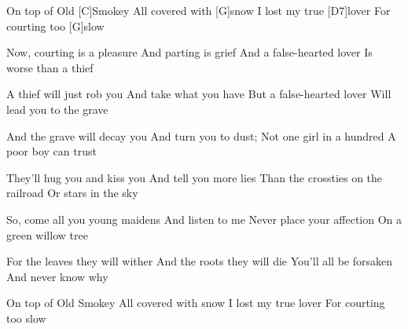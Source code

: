 
\sloka
[G7]On top of Old [C]Smokey
All covered with [G]snow
I lost my true [D7]lover
For courting too [G]slow

\sloka
Now, courting is a pleasure
And parting is grief
And a false-hearted lover
Is worse than a thief

\sloka
A thief will just rob you
And take what you have
But a false-hearted lover
Will lead you to the grave

\sloka
And the grave will decay you
And turn you to dust;
Not one girl in a hundred
A poor boy can trust

\sloka
They’ll hug you and kiss you
And tell you more lies
Than the crossties on the railroad
Or stars in the sky

\sloka
So, come all you young maidens
And listen to me
Never place your affection
On a green willow tree

\sloka
For the leaves they will wither
And the roots they will die
You’ll all be forsaken
And never know why

\sloka
On top of Old Smokey
All covered with snow
I lost my true lover
For courting too slow
